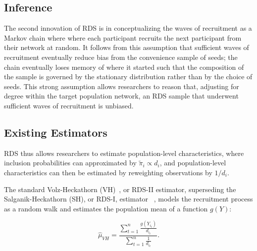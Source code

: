 \documentclass[11pt,a4paper,twocolumn,twoside]{rho-class/rho}
\begin{document}
\subsection{Inference}
The second innovation of RDS is in conceptualizing the waves of recruitment as a Markov chain where where each participant recruits the next participant from their network at random. It follows from this assumption that sufficient waves of recruitment eventually reduce bias from the convenience sample of seeds; the chain eventually loses memory of where it started such that the composition of the sample is governed by the stationary distribution rather than by the choice of seeds. This strong assumption allows researchers to reason that, adjusting for degree within the target population network, an RDS sample that underwent sufficient waves of recruitment is unbiased.

\subsection{Existing Estimators}
RDS thus allows researchers to estimate population-level characteristics, where inclusion probabilities can approximated by $\tilde{\pi}_i \propto d_i$, and population-level characteristics can then be estimated by reweighting observations by $1/d_i$. 

The standard Volz-Heckathorn (VH)~\cite{volz2008probability}, or RDS-II estimator, superseding the Salganik-Heckathorn (SH), or RDS-I, estimator ~\cite{salganik2004sampling}, models the recruitment process as a random walk and estimates the population mean of a function $g(Y)$:

\[
\hat \mu_{VH} = \frac{\sum_{t = 1}^n \frac{g(Y_{i_t})}{d_{i_t}}}{\sum_{t = 1}^n \frac{1}{d_{i_t}}}.
\]
\end{document}
